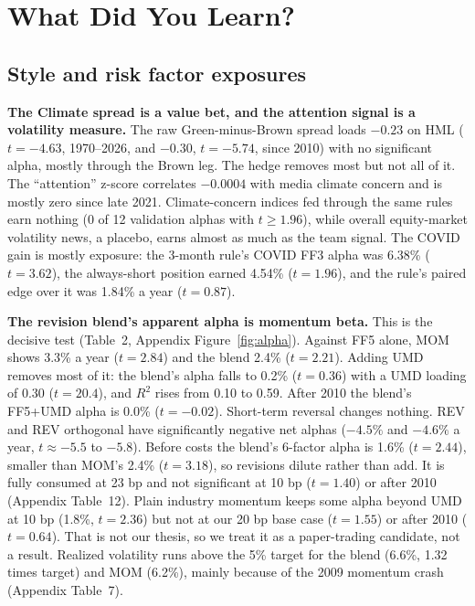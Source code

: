 \documentclass[11pt]{article}
\newcommand{\fit}[1]{\adjustbox{max width=\linewidth}{}}
\begin{document}
\section{What Did You Learn?}
\label{sec:learn}

\subsection{Style and risk factor exposures}
\label{sec:exposures}

\textbf{The Climate spread is a value bet, and the attention signal is a volatility measure.} The raw Green-minus-Brown spread loads $-0.23$ on HML ($t=-4.63$, 1970--2026, and $-0.30$, $t=-5.74$, since 2010) with no significant alpha, mostly through the Brown leg. The hedge removes most but not all of it. The ``attention'' z-score correlates $-0.0004$ with media climate concern \citep{ardia} and is mostly zero since late 2021. Climate-concern indices fed through the same rules earn nothing (0 of 12 validation alphas with $t\geq 1.96$), while overall equity-market volatility news, a placebo, earns almost as much as the team signal. The COVID gain is mostly exposure: the 3-month rule's COVID FF3 alpha was 6.38\% ($t=3.62$), the always-short position earned 4.54\% ($t=1.96$), and the rule's paired edge over it was 1.84\% a year ($t=0.87$).

\begin{table}[h]
\centering\footnotesize
\caption{Revision strategy, net returns (20 bp) regressed on FF5, FF5+UMD (primary) and FF5+UMD+short-term reversal (STREV). Annual alpha in \%, Newey--West (6 lags) $t$ in parentheses. Post-2010 has 192 return months for REV-based books and 199 for MOM.}
\label{tab:attr}
\fit{tables/T5_attribution.tex}
\end{table}

\textbf{The revision blend's apparent alpha is momentum beta.} This is the decisive test (Table~2, Appendix Figure~\ref{fig:alpha}). Against FF5 alone, MOM shows 3.3\% a year ($t=2.84$) and the blend 2.4\% ($t=2.21$). Adding UMD removes most of it: the blend's alpha falls to 0.2\% ($t=0.36$) with a UMD loading of 0.30 ($t=20.4$), and $R^2$ rises from 0.10 to 0.59. After 2010 the blend's FF5+UMD alpha is 0.0\% ($t=-0.02$). Short-term reversal changes nothing. REV and REV orthogonal have significantly negative net alphas ($-4.5\%$ and $-4.6\%$ a year, $t\approx-5.5$ to $-5.8$). Before costs the blend's 6-factor alpha is 1.6\% ($t=2.44$), smaller than MOM's 2.4\% ($t=3.18$), so revisions dilute rather than add. It is fully consumed at 23 bp and not significant at 10 bp ($t=1.40$) or after 2010 (Appendix Table~12). Plain industry momentum keeps some alpha beyond UMD at 10 bp (1.8\%, $t=2.36$) but not at our 20 bp base case ($t=1.55$) or after 2010 ($t=0.64$). That is not our thesis, so we treat it as a paper-trading candidate, not a result. Realized volatility runs above the 5\% target for the blend (6.6\%, 1.32 times target) and MOM (6.2\%), mainly because of the 2009 momentum crash (Appendix Table~7).
\end{document}
